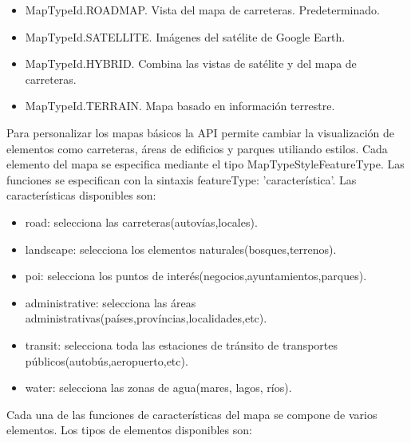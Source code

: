 \begin{itemize}

\item MapTypeId.ROADMAP. Vista del mapa de carreteras. Predeterminado.

\item MapTypeId.SATELLITE. Imágenes del satélite de Google Earth.

\item MapTypeId.HYBRID. Combina las vistas de satélite y del mapa de carreteras.

\item MapTypeId.TERRAIN. Mapa basado en información terrestre.

\end{itemize}

\vspace{5 mm}

Para personalizar los mapas básicos la API permite cambiar la visualización de elementos como carreteras, áreas de edificios y parques utiliando estilos. Cada elemento del mapa se especifica mediante el tipo MapTypeStyleFeatureType. Las funciones se especifican con la sintaxis featureType: 'característica'. Las características disponibles son:

\begin{itemize}

\item road: selecciona las carreteras(autovías,locales).

\item landscape: selecciona los elementos naturales(bosques,terrenos).

\item poi: selecciona los puntos de interés(negocios,ayuntamientos,parques).

\item administrative: selecciona las áreas administrativas(países,províncias,localidades,etc).

\item transit: selecciona toda las estaciones de tránsito de transportes públicos(autobús,aeropuerto,etc).

\item water: selecciona las zonas de agua(mares, lagos, ríos).

\end{itemize}

\vspace{5 mm}

Cada una de las funciones de características del mapa se compone de varios elementos. Los tipos de elementos disponibles son:

